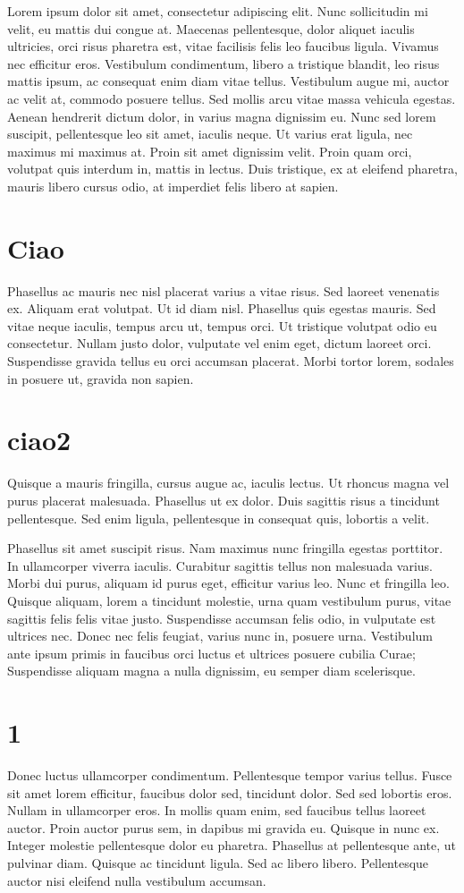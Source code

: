 Lorem ipsum dolor sit amet, consectetur adipiscing elit. Nunc sollicitudin mi velit, eu mattis dui congue at. Maecenas pellentesque, dolor aliquet iaculis ultricies, orci risus pharetra est, vitae facilisis felis leo faucibus ligula. Vivamus nec efficitur eros. Vestibulum condimentum, libero a tristique blandit, leo risus mattis ipsum, ac consequat enim diam vitae tellus. Vestibulum augue mi, auctor ac velit at, commodo posuere tellus. Sed mollis arcu vitae massa vehicula egestas. Aenean hendrerit dictum dolor, in varius magna dignissim eu. Nunc sed lorem suscipit, pellentesque leo sit amet, iaculis neque. Ut varius erat ligula, nec maximus mi maximus at. Proin sit amet dignissim velit. Proin quam orci, volutpat quis interdum in, mattis in lectus. Duis tristique, ex at eleifend pharetra, mauris libero cursus odio, at imperdiet felis libero at sapien.
\section{Ciao}
Phasellus ac mauris nec nisl placerat varius a vitae risus. Sed laoreet venenatis ex. Aliquam erat volutpat. Ut id diam nisl. Phasellus quis egestas mauris. Sed vitae neque iaculis, tempus arcu ut, tempus orci. Ut tristique volutpat odio eu consectetur. Nullam justo dolor, vulputate vel enim eget, dictum laoreet orci. Suspendisse gravida tellus eu orci accumsan placerat. Morbi tortor lorem, sodales in posuere ut, gravida non sapien.
\section{ciao2}
Quisque a mauris fringilla, cursus augue ac, iaculis lectus. Ut rhoncus magna vel purus placerat malesuada. Phasellus ut ex dolor. Duis sagittis risus a tincidunt pellentesque. Sed enim ligula, pellentesque in consequat quis, lobortis a velit. 

Phasellus sit amet suscipit risus. Nam maximus nunc fringilla egestas porttitor. In ullamcorper viverra iaculis. Curabitur sagittis tellus non malesuada varius. Morbi dui purus, aliquam id purus eget, efficitur varius leo. Nunc et fringilla leo. Quisque aliquam, lorem a tincidunt molestie, urna quam vestibulum purus, vitae sagittis felis felis vitae justo. Suspendisse accumsan felis odio, in vulputate est ultrices nec. Donec nec felis feugiat, varius nunc in, posuere urna. Vestibulum ante ipsum primis in faucibus orci luctus et ultrices posuere cubilia Curae; Suspendisse aliquam magna a nulla dignissim, eu semper diam scelerisque.
\section{1}
Donec luctus ullamcorper condimentum. Pellentesque tempor varius tellus. Fusce sit amet lorem efficitur, faucibus dolor sed, tincidunt dolor. Sed sed lobortis eros. Nullam in ullamcorper eros. In mollis quam enim, sed faucibus tellus laoreet auctor. Proin auctor purus sem, in dapibus mi gravida eu. Quisque in nunc ex. Integer molestie pellentesque dolor eu pharetra. Phasellus at pellentesque ante, ut pulvinar diam. Quisque ac tincidunt ligula. Sed ac libero libero. Pellentesque auctor nisi eleifend nulla vestibulum accumsan.

